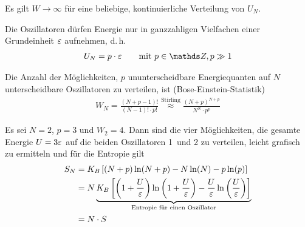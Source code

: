  Es gilt $W\to\infty$ für eine beliebige,
kontinuierliche Verteilung von $U_N$.

\begin{postulat}[Quantenpostulat]
  Die Oszillatoren dürfen Energie nur in ganzzahligen Vielfachen einer
  Grundeinheit $\varepsilon$ aufnehmen, d.\,h.
  \begin{gather*}
    U_N = p\cdot \eps 
    \qquad \text{mit } p\in\Z, p\gg 1
  \end{gather*}
\end{postulat}

\begin{postulat}
  Die Anzahl der Möglichkeiten, $p$ ununterscheidbare
  Energiequanten auf $N$ unterscheidbare Oszillatoren zu verteilen,
  ist (Bose-Einstein-Statistik)
  \begin{gather*}
    W_N = \frac{(N+p-1)!}{(N-1)!\cdot p!}
    \overset{\text{Stirling}}{\approx} 
    \frac{(N+p)^{N+p}}{N^N \cdot p^p}
  \end{gather*}
\end{postulat}  

\Beispiel{}
Es sei $N=2$, $p=3$ und $W_2=4$.
Dann sind die vier Möglichkeiten, die gesamte Energie $U=3\varepsilon$ auf
die beiden Oszillatoren 1~und 2 zu verteilen, leicht grafisch zu
ermitteln
und für die Entropie gilt
\begin{align*}
  S_N &= K_B \left[
        (N+p)\ln(N+p) - N\ln(N) - p\ln(p)
        \right]\\
      &= N \underbrace{
        K_B \left[
        \left(1+\frac{U}{\varepsilon}\right) \ln\left(1+\frac{U}{\varepsilon}\right) 
        - \frac{U}{\varepsilon}\ln\left(\frac{U}{\varepsilon}\right)
        \right]
        }_{\text{Entropie für einen Oszillator}}\\
      &= N\cdot S
\end{align*}



